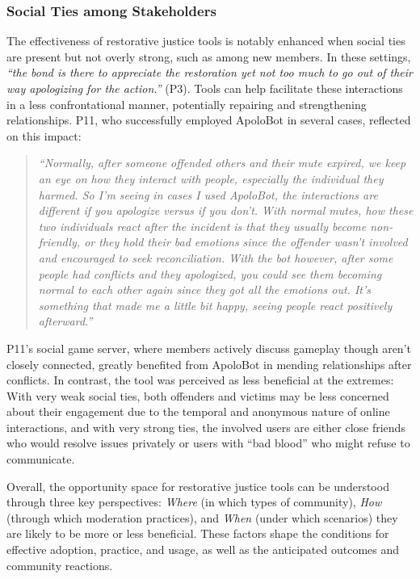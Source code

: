 \subsubsection{Social Ties among Stakeholders} The effectiveness of restorative justice tools is notably enhanced when social ties are present but not overly strong, such as among new members. In these settings, \textit{``the bond is there to appreciate the restoration yet not too much to go out of their way apologizing for the action.''} (P3). Tools can help facilitate these interactions in a less confrontational manner, potentially repairing and strengthening relationships. P11, who successfully employed ApoloBot in several cases, reflected on this impact:

\begin{quote}
    \textit{``Normally, after someone offended others and their mute expired, we keep an eye on how they interact with people, especially the individual they harmed. So I'm seeing in cases I used ApoloBot, the interactions are different if you apologize versus if you don’t. With normal mutes, how these two individuals react after the incident is that they usually become non-friendly, or they hold their bad emotions since the offender wasn’t involved and encouraged to seek reconciliation. With the bot however, after some people had conflicts and they apologized, you could see them becoming normal to each other again since they got all the emotions out. It's something that made me a little bit happy, seeing people react positively afterward.''}
\end{quote}

P11's social game server, where members actively discuss gameplay though aren't closely connected, greatly benefited from ApoloBot in mending relationships after conflicts. In contrast, the tool was perceived as less beneficial at the extremes: With very weak social ties, both offenders and victims may be less concerned about their engagement due to the temporal and anonymous nature of online interactions, and with very strong ties, the involved users are either close friends who would resolve issues privately or users with ``bad blood'' who might refuse to communicate.

Overall, the opportunity space for restorative justice tools can be understood through three key perspectives: \textit{Where} (in which types of community), \textit{How} (through which moderation practices), and \textit{When} (under which scenarios) they are likely to be more or less beneficial. These factors shape the conditions for effective adoption, practice, and usage, as well as the anticipated outcomes and community reactions.

